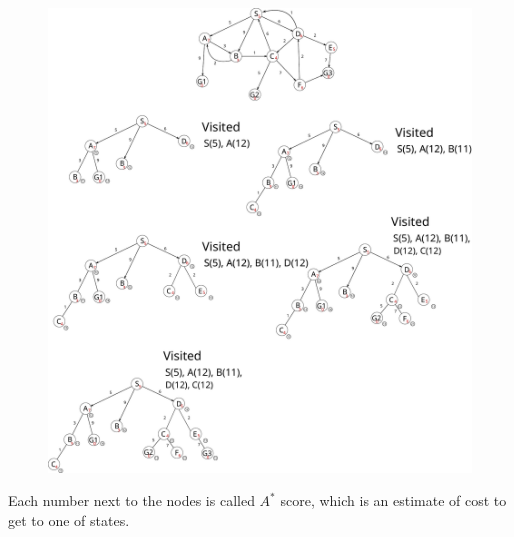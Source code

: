 \begin{figure}[h]
	\centering
	\includegraphics[scale=0.4]{./images/search_alg/astar_search.pdf}
\end{figure}

Each number next to the nodes is called $A^*$ score, which is an estimate of cost to get to one of states. 


